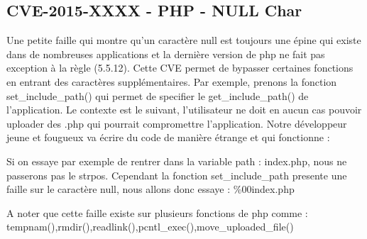\documentclass{article}
\begin{document}
\subsection{CVE-2015-XXXX - PHP - NULL Char}

Une petite faille qui montre qu'un caractère null est toujours une épine qui existe dans de nombreuses applications et la dernière version de php ne fait pas exception à la règle (5.5.12). Cette CVE permet de bypasser certaines fonctions en entrant des caractères supplémentaires. Par exemple, prenons la fonction set\_include\_path() qui permet de specifier le get\_include\_path() de l'application. Le contexte est le suivant, l'utilisateur ne doit en aucun cas pouvoir uploader des .php qui pourrait compromettre l'application. Notre développeur jeune et fougueux va écrire du code de manière étrange et qui fonctionne :
\vspace{0.2cm}\\
\vspace{0.2cm}

Si on essaye par exemple de rentrer dans la variable path : index.php, nous ne passerons pas le strpos. Cependant la fonction set\_include\_path presente une faille sur le caractère null, nous allons donc essaye : \%00index.php
\vspace{0.2cm}\\
\vspace{0.2cm}

A noter que cette faille existe sur plusieurs fonctions de php comme :\\ 

tempnam(),rmdir(),readlink(),pcntl\_exec(),move\_uploaded\_file()\\
\end{document}
